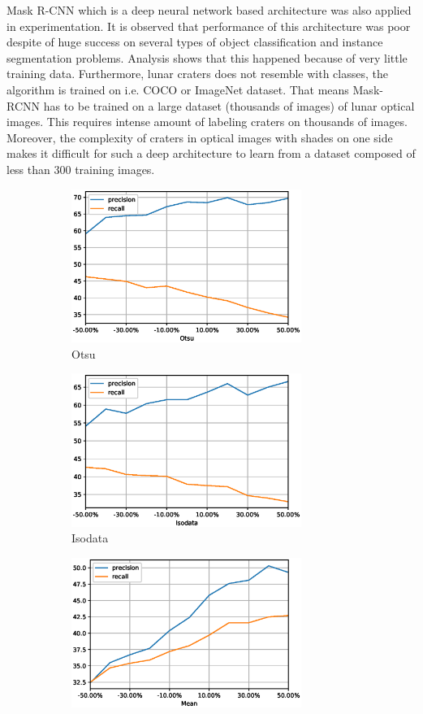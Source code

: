 \documentclass[11pt]{article}
\begin{document}
Mask R-CNN which is a deep neural network based architecture was also applied in experimentation. It is observed that performance of this architecture was poor despite of huge success on several types of object classification and instance segmentation problems. Analysis shows that this happened because of very little training data. Furthermore, lunar craters does not resemble with classes, the algorithm is trained on i.e. COCO or ImageNet dataset. That means Mask-RCNN has to be trained on a large dataset (thousands of images) of lunar optical images. This requires intense amount of labeling craters on thousands of images. Moreover, the complexity of craters in optical images with shades on one side makes it difficult for such a deep architecture to learn from a dataset composed of less than 300 training images.
 
\begin{figure}[H]
	\begin{subfigure}{7cm}
		\centering\includegraphics[width=7.5cm]{files/results/otsu.eps}
		\caption{Otsu}
	\end{subfigure}
	\begin{subfigure}{7cm}
		\centering\includegraphics[width=7.5cm]{files/results/isodata.eps}
		\caption{Isodata}
	\end{subfigure}
	\begin{subfigure}{7cm}
		\centering\includegraphics[width=7.5cm]{files/results/mean.eps}

\end{subfigure}
\end{figure}
\end{document}
